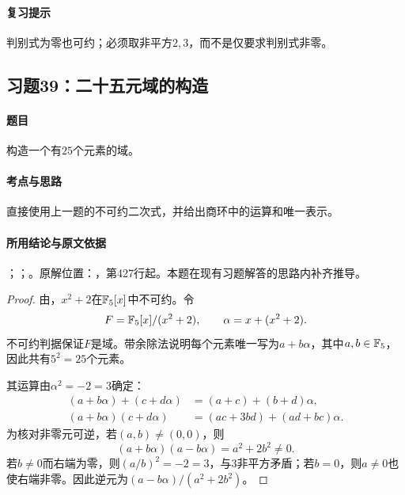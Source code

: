\paragraph{复习提示}

判别式为零也可约；必须取非平方$2,3$，而不是仅要求判别式非零。



\subsection{习题39：二十五元域的构造}

\label{ex:3:39}

\paragraph{题目}

构造一个有$25$个元素的域。

\paragraph{考点与思路}

直接使用上一题的不可约二次式，并给出商环中的运算和唯一表示。

\paragraph{所用结论与原文依据}

；；。原解位置：，第427行起。本题在现有习题解答的思路内补齐推导。


\begin{proof}

由，$x^2+2$在$\mathbb F_5[x]$中不可约。令
\[
F=\mathbb F_5[x]/(x^2+2),\qquad \alpha=x+(x^2+2).
\]
不可约判据保证$F$是域。带余除法说明每个元素唯一写为$a+b\alpha$，其中$a,b\in\mathbb F_5$，因此共有$5^2=25$个元素。

其运算由$\alpha^2=-2=3$确定：
\begin{align*}
(a+b\alpha)+(c+d\alpha)&=(a+c)+(b+d)\alpha,\\
(a+b\alpha)(c+d\alpha)&=(ac+3bd)+(ad+bc)\alpha.
\end{align*}
为核对非零元可逆，若$(a,b)\ne(0,0)$，则
\[
(a+b\alpha)(a-b\alpha)=a^2+2b^2\ne0.
\]
若$b\ne0$而右端为零，则$(a/b)^2=-2=3$，与$3$非平方矛盾；若$b=0$，则$a\ne0$也使右端非零。因此逆元为$(a-b\alpha)/(a^2+2b^2)$。

\end{proof}

